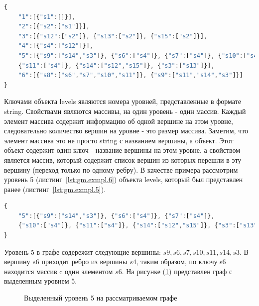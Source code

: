 \begin{lstlisting}[label={lst:gm.exmpl.5}, caption={Объект levels после разбиения вершин по уровням}, language=JavaScript]
{
    "1":[{"s1":[]}],
    "2":[{"s2":["s1"]}],
    "3":[{"s12":["s2"]}, {"s13":["s2"]}, {"s15":["s2"]}],
    "4":[{"s4":["s12"]}],
    "5":[{"s9":["s14","s3"]}, {"s6":["s4"]}, {"s7":["s4"]}, {"s10":["s4"]}, 
    {"s11":["s4"]}, {"s14":["s12","s15"]}, {"s3":["s13"]}],
    "6":[{"s8":["s6","s7","s10","s11"]}, {"s9":["s11","s14","s3"]}]
}
\end{lstlisting}

Ключами объекта levels являются номера уровней, представленные в формате string. Свойствами являются массивы, на один уровень - один массив. Каждый элемент массива содержит информацию об одной вершине на этом уровне, следовательно количество вершин на уровне - это размер массива. Заметим, что элемент массива это не просто string с названием вершины, а объект. Этот объект содержит один ключ - название вершины на этом уровне, а свойством является массив, который содержит список вершин из которых перешли в эту вершину (переход только по одному ребру). В качестве примера рассмотрим уровень 5 (листинг~\ref{lst:gm.exmpl.6}) объекта levels, который был представлен ранее (листинг~\ref{lst:gm.exmpl.5}).

\begin{lstlisting}[label={lst:gm.exmpl.6}, caption={Пример уровень 5 объекта levels}, language=JavaScript]
{
    "5":[{"s9":["s14","s3"]}, {"s6":["s4"]}, {"s7":["s4"]}, 
    {"s10":["s4"]}, {"s11":["s4"]}, {"s14":["s12","s15"]}, {"s3":["s13"]}],
}
\end{lstlisting}

Уровень 5 в графе содережит следующие вершины: $s9, s6, s7, s10, s11, s14, s3$. В вершину $s6$ приходит ребро из вершины $s4$, таким образом, по ключу s6 находится массив c один элементом $s6$. На рисунке (\ref{fig:main_graph_level5}) представлен граф с выделенным уровнем 5.

\begin{figure}[ht!]
\caption{Выделенный уровень 5 на рассматриваемом графе}
\label{fig:main_graph_level5}
\end{figure}

